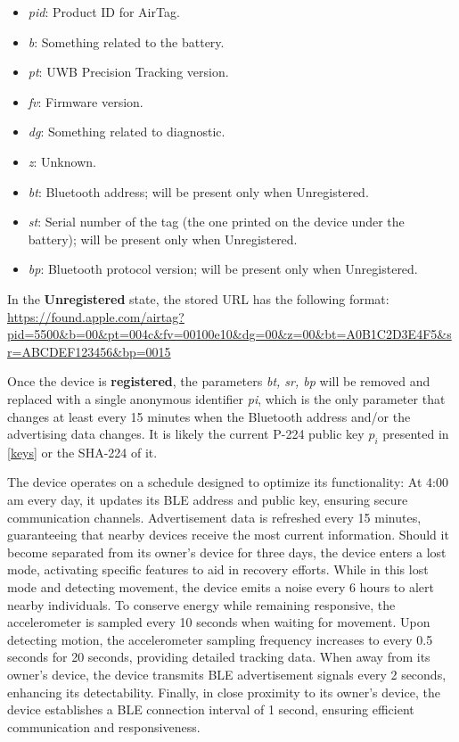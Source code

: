 \documentclass[english]{article}
\begin{document}
\begin{itemize}
  \item \textit{pid}: Product ID for AirTag.
  \item \textit{b}: Something related to the battery.
  \item \textit{pt}: UWB Precision Tracking version.
  \item \textit{fv}: Firmware version.
  \item \textit{dg}: Something related to diagnostic.
  \item \textit{z}: Unknown.
  \item \textit{bt}: Bluetooth address; will be present only when Unregistered.
  \item \textit{st}: Serial number of the tag (the one printed on the device under the battery); will be present only when Unregistered.
  \item \textit{bp}: Bluetooth protocol version; will be present only when Unregistered.
\end{itemize}
In the \textbf{Unregistered} state, the stored URL has the following format:
\url{https://found.apple.com/airtag?pid=5500&b=00&pt=004c&fv=00100e10&dg=00&z=00&bt=A0B1C2D3E4F5&sr=ABCDEF123456&bp=0015}

Once the device is \textbf{registered}, the parameters \textit{bt, sr, bp} will be removed and replaced with a single anonymous identifier \textit{pi}, which is the only parameter that changes at least every 15 minutes when the Bluetooth address and/or the advertising data changes. It is likely the current P-224 public key $p_i$ presented in \ref{keys} or the SHA-224 of it. 


The device operates on a schedule designed to optimize its functionality:
At 4:00 am every day, it updates its BLE address and public key, ensuring secure communication channels.
Advertisement data is refreshed every 15 minutes, guaranteeing that nearby devices receive the most current information.
Should it become separated from its owner's device for three days, the device enters a lost mode, activating specific features to aid in recovery efforts.
While in this lost mode and detecting movement, the device emits a noise every 6 hours to alert nearby individuals.
To conserve energy while remaining responsive, the accelerometer is sampled every 10 seconds when waiting for movement.
Upon detecting motion, the accelerometer sampling frequency increases to every 0.5 seconds for 20 seconds, providing detailed tracking data.
When away from its owner's device, the device transmits BLE advertisement signals every 2 seconds, enhancing its detectability.
Finally, in close proximity to its owner's device, the device establishes a BLE connection interval of 1 second, ensuring efficient communication and responsiveness.
\end{document}
